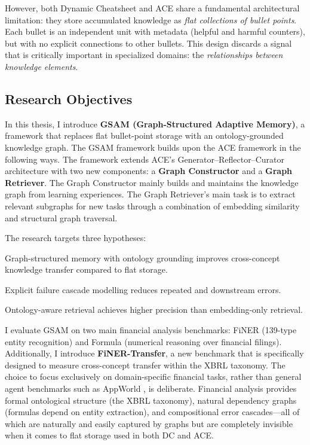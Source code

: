 \documentclass[12pt,a4paper,oneside]{article}
\begin{document}
However, both Dynamic Cheatsheet and ACE share a fundamental architectural limitation: they store accumulated knowledge as \textit{flat collections of bullet points}. Each bullet is an independent unit with metadata (helpful and harmful counters), but with no explicit connections to other bullets. This design discards a signal that is critically important in specialized domains: the \textit{relationships between knowledge elements}.

\subsection{Research Objectives}

In this thesis, I introduce \textbf{GSAM (Graph-Structured Adaptive Memory)}, a framework that replaces flat bullet-point storage with an ontology-grounded knowledge graph. The GSAM framework builds upon the ACE framework in the following ways. The framework extends ACE's Generator--Reflector--Curator architecture with two new components: a \textbf{Graph Constructor} and a \textbf{Graph Retriever}. The Graph Constructor mainly builds and maintains the knowledge graph from learning experiences. The Graph Retriever's main task is to extract relevant subgraphs for new tasks through a combination of embedding similarity and structural graph traversal.

The research targets three hypotheses:

\begin{description}[style=nextline, leftmargin=1.5cm]
\item[\textbf{H1:}] Graph-structured memory with ontology grounding improves cross-concept knowledge transfer compared to flat storage.
\item[\textbf{H2:}] Explicit failure cascade modelling reduces repeated and downstream errors.
\item[\textbf{H3:}] Ontology-aware retrieval achieves higher precision than embedding-only retrieval.
\end{description}

I evaluate GSAM on two main financial analysis benchmarks: FiNER \citep{loukas2022finer} (139-type entity recognition) and Formula \citep{wang2025finlora} (numerical reasoning over financial filings). Additionally, I introduce \textbf{FiNER-Transfer}, a new benchmark that is specifically designed to measure cross-concept transfer within the XBRL taxonomy. The choice to focus exclusively on domain-specific financial tasks, rather than general agent benchmarks such as AppWorld \citep{trivedi2024appworld}, is deliberate. Financial analysis provides formal ontological structure (the XBRL taxonomy), natural dependency graphs (formulas depend on entity extraction), and compositional error cascades---all of which are naturally and easily captured by graphs but are completely invisible when it comes to flat storage used in both DC and ACE.
\end{document}
